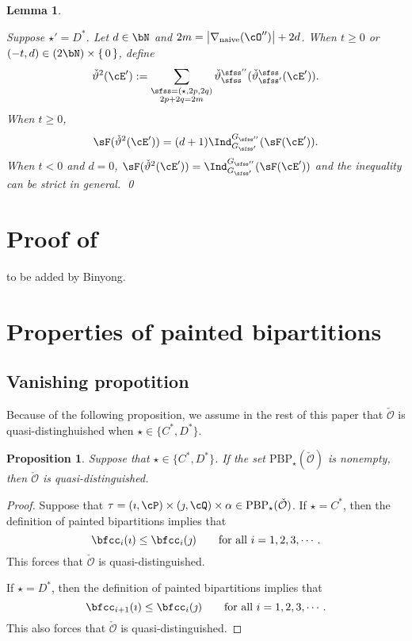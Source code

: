 \documentclass[12pt,a4paper]{amsart}
\def\abs#1{\left|{#1}\right|}
\newcommand{\CO}{{\mathcal {O}}}
\def\DD{\nabla}
\numberwithin{equation}{section}
\newtheorem{lem}[thm]{Lemma}
\newtheorem{prop}[thm]{Proposition}
\theoremstyle{remark}
\def\DDn{\DD_{\mathrm{naive}}}
\def\cOpp{\cO^{\prime\prime}}
\begin{document}
\begin{lem}
\begin{enuma}
 \item Suppose $\star' = D^*$. 
    Let $d\in \bN$ and $2m = \abs{\DDn(\cOpp)}+2d$.
    When $t\geq 0$ or $(-t,d) \in (2\bN)\times \set{0}$, define
 \[
   \dblift(\cE') := 
   \sum_{\substack{\sfss = (\star,2p,2q)\\ 2p+2q=2m}}
   \dlift_{\sfss}^{\sfss''}(\dlift_{\sfss'}^{\sfss}(\cE')).
   \]    
  When $t\geq 0$,   
  \[
    \sF(\dblift(\cE')) = (d+1) \indsss(\sF(\cE')). 
  \]
  When $t< 0$ and $d=0$,  $\sF(\dblift(\cE')) = \indsss(\sF(\cE'))$ 
  and the inequality can be strict in general. \qed
  \end{enuma}
\end{lem}


\section{Proof of }
to be added by Binyong.


\section{Properties of painted bipartitions}
\def\ckfgg{{\check \fgg}}
\def\pcT{\cT^+}
\def\ncT{\cT^-}


\subsection{Vanishing propotition}
Because of the following proposition, we assume in the rest of this paper that $\check \CO$ is quasi-distinghuished  when $\star\in \{C^*, D^*\}$.


\begin{prop}
  Suppose that $\star\in \{C^*, D^*\}$. If the set $\mathrm{PBP}_\star(\check \CO)$ is nonempty, then $\check \CO$ is quasi-distinguished.
\end{prop}
\begin{proof}
  Suppose that $\tau=(\imath,\cP)\times(\jmath,\cQ)\times \alpha \in  \mathrm{PBP}_\star(\check \CO)$. If  $\star=C^*$, then  the definition of painted bipartitions implies that
 \[
 \bfcc_i(\imath)\leq \bfcc_i(\jmath) \qquad \textrm{for all } i=1,2,3, \cdots.
 \]
This forces that $\check \CO$ is quasi-distinguished.

 If  $\star=D^*$, then  the definition of painted bipartitions implies that
 \[
 \bfcc_{i+1}(\imath)\leq \bfcc_i(\jmath) \qquad \textrm{for all } i=1,2,3, \cdots.
 \]
This  also forces that   $\check \CO$ is quasi-distinguished.
 \end{proof}
\end{document}
